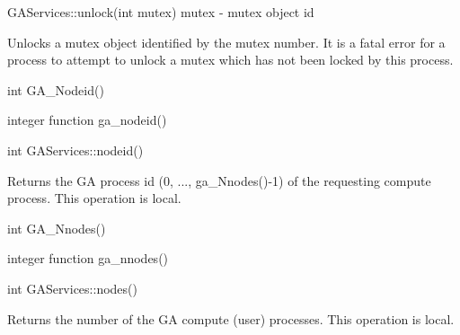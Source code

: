 \documentclass[12pt]{article}
\begin{document}
\begin{cxxapi}
GAServices::unlock(int mutex)
mutex - mutex object id                                                   \access{[input]}
\end{cxxapi}

\begin{desc}

Unlocks a mutex object identified by the mutex number. It is a fatal error for a process to attempt to unlock a mutex which has not been locked by this process.
\end{desc}


\begin{capi}
int GA_Nodeid()
\end{capi}

\begin{fapi}
integer function ga_nodeid()
\end{fapi}

\begin{cxxapi}
int GAServices::nodeid()
\end{cxxapi}

\begin{desc}

Returns the GA process id (0, ..., ga_Nnodes()-1) of the requesting compute process.
This operation is local.
\end{desc}


\begin{capi}
int GA_Nnodes()
\end{capi}

\begin{fapi}
integer function ga_nnodes()
\end{fapi}

\begin{cxxapi}
int GAServices::nodes()
\end{cxxapi}

\begin{desc}

Returns the number of the GA compute (user) processes.
This operation is local.
\end{desc}

\end{document}
